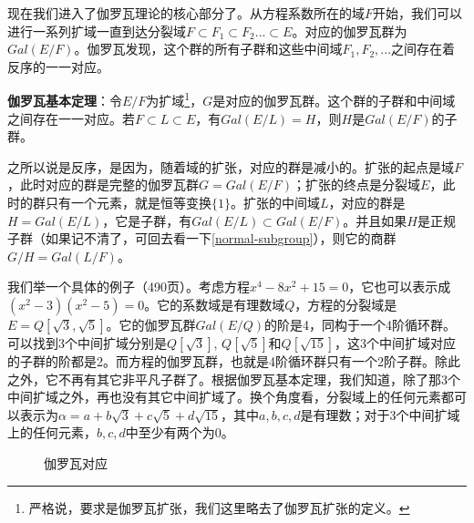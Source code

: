 \documentclass[b5paper]{ctexart}
\begin{document}
现在我们进入了伽罗瓦理论的核心部分了。从方程系数所在的域$F$开始，我们可以进行一系列扩域一直到达分裂域$F \subset F_1 \subset F_2 ... \subset E$。对应的伽罗瓦群为$Gal(E/F)$。伽罗瓦发现，这个群的所有子群和这些中间域$F_1, F_2, ...$之间存在着反序的一一对应。

\begin{theorem}
\textbf{伽罗瓦基本定理}：令$E/F$为扩域\footnote{严格说，要求是伽罗瓦扩张，我们这里略去了伽罗瓦扩张的定义。}，$G$是对应的伽罗瓦群。这个群的子群和中间域之间存在一一对应。若$F \subset L \subset E$，有$Gal(E/L) = H$，则$H$是$Gal(E/F)$的子群。
\end{theorem}

之所以说是反序，是因为，随着域的扩张，对应的群是减小的。扩张的起点是域$F$，此时对应的群是完整的伽罗瓦群$G = Gal(E/F)$；扩张的终点是分裂域$E$，此时的群只有一个元素，就是恒等变换$\{1\}$。扩张的中间域$L$，对应的群是$H = Gal(E/L)$，它是子群，有$Gal(E/L) \subset Gal(E/F)$。并且如果$H$是正规子群（如果记不清了，可回去看一下\ref{normal-subgroup}），则它的商群$G/H = Gal(L/F)$。

我们举一个具体的例子\cite{MArtin}（490页）。考虑方程$x^4 - 8x^2 + 15 = 0$，它也可以表示成$(x^2 - 3)(x^2 - 5) = 0$。它的系数域是有理数域$Q$，方程的分裂域是$E = Q[\sqrt{3}, \sqrt{5}]$。它的伽罗瓦群$Gal(E/Q)$的阶是4，同构于一个4阶循环群。可以找到3个中间扩域分别是$Q[\sqrt{3}]$, $Q[\sqrt{5}]$和$Q[\sqrt{15}]$，这3个中间扩域对应的子群的阶都是2。而方程的伽罗瓦群，也就是4阶循环群只有一个2阶子群。除此之外，它不再有其它非平凡子群了。根据伽罗瓦基本定理，我们知道，除了那3个中间扩域之外，再也没有其它中间扩域了。换个角度看，分裂域上的任何元素都可以表示为$\alpha = a + b\sqrt{3} + c\sqrt{5} + d\sqrt{15}$，其中$a, b, c, d$是有理数；对于3个中间扩域上的任何元素，$b, c, d$中至少有两个为0。

\begin{figure}[htbp]
\centering
{}
\caption{伽罗瓦对应}
\label{fig:Galois-Correspondence}
\end{figure}
\end{document}
